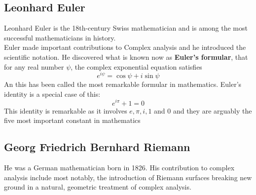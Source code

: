 \documentclass[11pt]{report}
\newcommand{\sps}{\\[0.2cm]}
\begin{document}
	\subsection{Leonhard Euler}
	Leonhard Euler is the 18th-century Swiss mathematician and is among the most successful mathematicians in history.\\
	Euler made important contributions to Complex analysis and he introduced the scientific notation. He discovered what is known now as \textbf{Euler's formular}, that for any real number $\psi$, the complex exponential equation satisfies
	\begin{equation}
		e^{i\psi} = \cos\psi + i\sin\psi
	\end{equation}
	An this has been called the most remarkable formular in mathematics. Euler's identity is a special case of this:
	\begin{equation}
		e^{i\pi} + 1 = 0
	\end{equation}
	This identity is remarkable as it involves $e,\pi,i,1$ and $0$ and they are arguably the five most important constant in mathematics\sps
	
	\begin{center}
	\end{center}

	\subsection{Georg Friedrich Bernhard Riemann}
	He was a German mathematician born in 1826. His contribution to complex analysis include most notably, the introduction of Riemann surfaces breaking new ground in a natural, geometric treatment of complex analysis.
	
\end{document}
